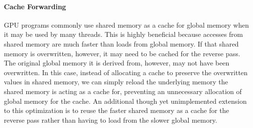 

\paragraph{\textbf{Cache Forwarding}}
 GPU programs commonly use shared memory as a cache for global memory when it may be used by many threads. This is highly beneficial because accesses from shared memory are much faster than loads from global memory. If that shared memory is overwritten, however, it may need to be cached for the reverse pass. The original global memory it is derived from, however, may not have been overwritten. In this case, instead of allocating a cache to preserve the overwritten values in shared memory, we can simply reload the underlying memory the shared memory is acting as a cache for, preventing an unnecessary allocation of global memory for the cache. An additional though yet unimplemented extension to this optimization is to reuse the faster shared memory as a cache for the reverse pass rather than having to load from the slower global memory.

